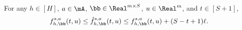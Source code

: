 \documentclass[pdftex, a4paper, 12pt]{article}
\newcommand{\round}[2]{\ceil{#2}_{#1}}
\newcommand{\hb}{\hat{b}}
\newcommand{\hf}{\hat{f}}
\DeclareMathOperator*{\f}{\mathit{f}}
\DeclareMathOperator*{\g}{\mathit{g}}
\begin{document}


\begin{lemma}\label{lem: space-error}
    For any $h \in [H]$, $a \in \mA$, $\bb \in \Real^{m\times S}$, $u \in \Real^m$, and $t \in [S+1]$,
    \begin{equation}
        f_{h,\bb}^{s,a}(t, u) \leq \hf_{h,\bb}^{s,a}(t, u) \leq f_{h,\bb}^{s,a}(t, u) + (S-t+1)\ell.
    \end{equation}
\end{lemma}
\end{document}
